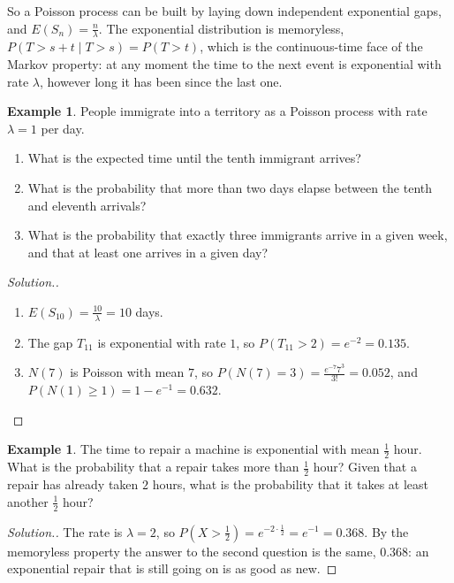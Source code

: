 \documentclass[12pt,a4paper]{report}
\theoremstyle{definition}
\newtheorem{exa}[thm]{Example}
\newenvironment{solution}
  {\renewcommand{\qedsymbol}{}\begin{proof}[\textit{Solution}.]}
  {\end{proof}}
\begin{document}
So a Poisson process can be built by laying down independent exponential gaps, and
$E(S_n) = \frac n\lambda$. The exponential distribution is memoryless,
$P(T>s + t\mid T>s) = P(T>t)$, which is the continuous-time face of the Markov property: at any
moment the time to the next event is exponential with rate $\lambda$, however long it has been
since the last one.

\begin{exa}
\label{ex:immigrants}
People immigrate into a territory as a Poisson process with rate $\lambda = 1$ per day.
\begin{enumerate}
\item[(a)] What is the expected time until the tenth immigrant arrives?
\item[(b)] What is the probability that more than two days elapse between the tenth and eleventh
arrivals?
\item[(c)] What is the probability that exactly three immigrants arrive in a given week, and that
at least one arrives in a given day?
\end{enumerate}
\end{exa}

\begin{solution}
\begin{enumerate}
\item[(a)] $E(S_{10}) = \frac{10}{\lambda} = 10$ days.
\item[(b)] The gap $T_{11}$ is exponential with rate $1$, so $P(T_{11}>2) = e^{-2} = 0.135$.
\item[(c)] $N(7)$ is Poisson with mean $7$, so $P(N(7) = 3) = \frac{e^{-7}7^3}{3!} = 0.052$, and
$P(N(1)\geq 1) = 1 - e^{-1} = 0.632$.
\end{enumerate}
\end{solution}

\begin{exa}
\label{ex:repair}
The time to repair a machine is exponential with mean $\frac12$ hour. What is the probability that
a repair takes more than $\frac12$ hour? Given that a repair has already taken $2$ hours, what is the
probability that it takes at least another $\frac12$ hour?
\end{exa}

\begin{solution}
The rate is $\lambda = 2$, so $P(X>\frac12) = e^{-2\cdot\frac12} = e^{-1} = 0.368$. By the memoryless
property the answer to the second question is the same, $0.368$: an exponential repair that is
still going on is as good as new.
\end{solution}
\end{document}
